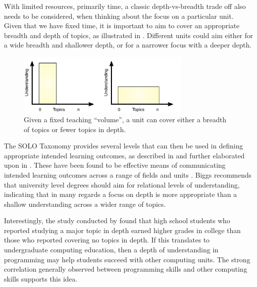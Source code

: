 With limited resources, primarily time, a classic depth-vs-breadth trade off also needs to be considered, when thinking about the focus on a particular unit. Given that we have fixed time, it is important to aim to cover an appropriate breadth and depth of topics, as illustrated in . Different units could aim either for a wide breadth and shallower depth, or for a narrower focus with a deeper depth.

\begin{figure}[htbp]
	\centering
	\includegraphics[width=0.75\textwidth]{DepthOrBreadth}
	\caption{Given a fixed teaching ``volume'', a unit can cover either a breadth of topics or fewer topics in depth.}
	\label{fig:depth}
\end{figure}

%

The SOLO Taxonomy \cite{Biggs:1982} provides several levels that can then be used in defining appropriate intended learning outcomes, as described in \citet{Biggs:1996c} and further elaborated upon in \citet{Biggs:2007}. These have been found to be effective means of communicating intended learning outcomes across a range of fields and units \cite{Brabrand:2007,Brabrand:2009}. Biggs recommends that university level degrees should aim for relational levels of understanding, indicating that in many regards a focus on depth is more appropriate than a shallow understanding across a wider range of topics.

Interestingly, the study conducted by \citet{Schwartz:2009} found that high school students who reported studying a major topic in depth earned higher grades in college than those who reported covering no topics in depth. If this translates to undergraduate computing education, then a depth of understanding in programming may help students succeed with other computing units. The strong correlation generally observed between programming skills and other computing skills \cite{McGettrick:2005} supports this idea.

